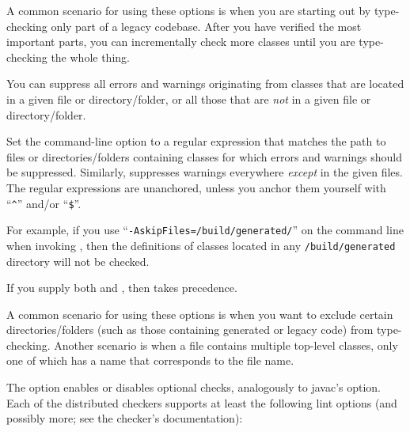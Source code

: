 A common scenario for using these options is when you are starting out by
type-checking only part of a legacy codebase.  After you have verified the
most important parts, you can incrementally check more classes until you
are type-checking the whole thing.



You can suppress all errors and warnings originating from classes that are
located in a given file or directory/folder, or all those that are \emph{not} in a
given file or directory/folder.

Set the  command-line option to a
regular expression that matches the path to files or directories/folders containing
classes for which errors and warnings should be suppressed.
Similarly,  suppresses warnings everywhere
\emph{except} in the given files.
The regular expressions are unanchored, unless you anchor them yourself
with ``\codesize\verb|^|'' and/or ``\codesize\verb|$|''.

For example, if you use
``{\codesize\verb|-AskipFiles=/build/generated/|}'' on the command line
when invoking
, then the definitions of classes located in any
\codesize\verb|/build/generated| directory will not be checked.

If you supply both  and , then
 takes precedence.

A common scenario for using these options is when you want to exclude certain
directories/folders (such as those containing generated or legacy code) from
type-checking.
Another scenario is when a file contains multiple top-level classes, only
one of which has a name that corresponds to the file name.


\label{lint-options}

The  option enables or disables optional checks, analogously to
javac's  option.
Each of the distributed checkers supports at least the following lint
options (and possibly more; see the checker's documentation):




